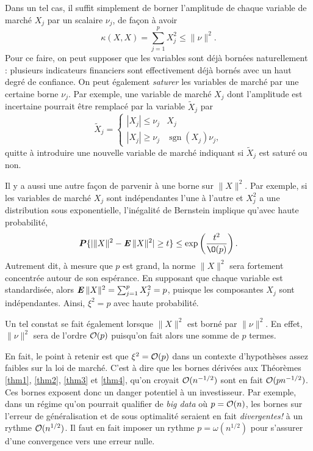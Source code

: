 Dans un tel cas, il suffit simplement de borner l'amplitude de chaque variable de marché
$X_j$ par un scalaire $\nu_j$, de façon à avoir
\begin{equation}
  \kappa(X,X) = \sum_{j=1}^p X_j^2 \leq \|\nu\|^2.
\end{equation}
Pour ce faire, on peut supposer que les variables sont déjà bornées naturellement :
plusieurs indicateurs financiers sont effectivement déjà bornés avec un haut degré de
confiance. On peut également \textit{saturer} les variables de marché par une certaine
borne $\nu_j$. Par exemple, une variable de marché $X_j$ dont l'amplitude est incertaine
pourrait être remplacé par la variable $\tilde X_j$ par
\begin{equation}
  \tilde X_j = \begin{cases}
    |X_j| \leq \nu_j & X_j\\
    |X_j| \geq \nu_j & \operatorname{sgn}(X_j)\nu_j,
  \end{cases}
\end{equation}
quitte à introduire une nouvelle variable de marché indiquant si $\tilde X_j$ est saturé
ou non.

Il y a aussi une autre façon de parvenir à une borne sur $\|X\|^2$. Par exemple, si les
variables de marché $X_j$ sont indépendantes l'une à l'autre et $X_j^2$ a une distribution
sous exponentielle, l'inégalité de Bernstein implique qu'avec haute probabilité,
\begin{equation}
  \pp\{|\|X\|^2 - \E\|X\|^2| \geq t\} \leq \exp\left(\frac{t^2}{\O(p)}\right).
\end{equation}
Autrement dit, à mesure que $p$ est grand, la norme $\|X\|^2$ sera fortement concentrée
autour de son espérance. En supposant que chaque variable est standardisée, alors
$\operatorname{\mbox{\textbf{\textit{E}}}}\|X\|^2 = \sum_{j=1}^pX_j^2 = p$, puisque les composantes $X_j$ sont
indépendantes. Ainsi, $\xi^2 = p$ avec haute probabilité.

Un tel constat se fait également lorsque $\|X\|^2$ est borné par $\|\nu\|^2$. En effet,
$\|\nu\|^2$ sera de l'ordre $\mathcal O(p)$ puisqu'on fait alors une somme de $p$ termes.


En fait, le point à retenir est que $\xi^2 = \mathcal O(p)$ dans un contexte d'hypothèses assez
faibles sur la loi de marché. C'est à dire que les bornes dérivées aux Théorèmes
\ref{thm1}, \ref{thm2}, \ref{thm3} et \ref{thm4}, qu'on croyait
$\mathcal O(n^{-1/2})$ sont en fait $\mathcal O(pn^{-1/2})$. Ces bornes exposent donc un
danger potentiel à un investisseur. Par exemple, dans un régime qu'on pourrait qualifier
de \textit{big data} où $p=\mathcal O(n)$, les bornes sur l'erreur de généralisation et de sous
optimalité seraient en fait \textit{divergentes!} à un rythme $\mathcal O(n^{1/2})$. Il faut en
fait imposer un rythme $p = \omega(n^{1/2})$ pour s'assurer d'une convergence vers une erreur
nulle.

